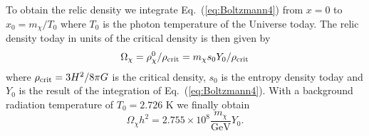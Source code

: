
To obtain the relic density we integrate Eq.~(\ref{eq:Boltzmann4})
from $x=0$ to $x_0=m_\chi/T_0$ where $T_0$ is the photon temperature
of the Universe today. The relic density today in units of the
critical density is then given by
\begin{equation}
  \Omega_\chi = \rho_\chi^0/\rho_{\rm
  crit}=m_\chi s_0 Y_0/\rho_{\rm crit}
\end{equation}
where $\rho_{\rm crit}=3 H^2/8 \pi G$ is the critical density, $s_{0}$ 
is the entropy density today and $Y_{0}$ is the result of the 
integration of Eq.~(\ref{eq:Boltzmann4}). With a
background radiation temperature of $T_0=2.726$ K we finally obtain
\begin{equation} \label{eq:omegah2}
  \Omega_\chi h^2 = 2.755\times 10^8 \frac{m_\chi}{\mbox{GeV}} Y_0.
\end{equation}
